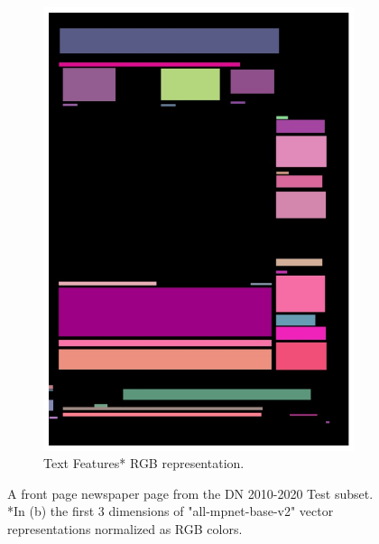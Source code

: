 \documentclass[oneside, english, bibtex]{kththesis}
\begin{document}
\begin{figure}[!htb]
\begin{adjustbox}{center,max size={\textwidth}{0.9\textheight}}
{\begin{subfigure}{0.75\textwidth}
  \includegraphics[width=\linewidth, clip=true, trim = 0mm 0mm 0mm 0mm]{figures/tf/JIefsDa.jpg}
  \caption{Text Features* RGB representation.}
  \label{fig:JIefsDa_tf}
\end{subfigure}}
\end{adjustbox}
  \caption{A front page newspaper page from the DN 2010-2020 Test subset. *In (b) the first 3 dimensions of "all-mpnet-base-v2" vector representations normalized as RGB colors.}
\label{fig:JIefsDa_tf}
\end{figure}

\clearpage 
\end{document}
